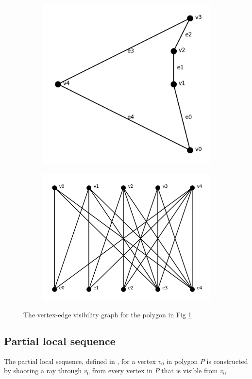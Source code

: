 \documentclass[letterpaper, 10 pt, conference]{ieeeconf}  %
\begin{document}
\begin{figure}
\centering
\begin{subfigure}{0.25\textwidth}
  \includegraphics[width=0.6\linewidth]{images/concave_pent.png}
  \label{fig:c_p}
\end{subfigure}
\begin{subfigure}{0.25\textwidth}
  \includegraphics[width=0.8\linewidth]{images/viz_edge_graph.png}
\end{subfigure}
\caption{The vertex-edge visibility graph for the polygon in Fig
\ref{fig:c_p}\label{fig:veg}}

\end{figure}


\subsection{Partial local sequence}

The partial local sequence, defined in \cite{rourke_viz}, 
for a vertex $v_0$ in polygon $P$ is constructed 
by shooting a ray through $v_0$ from every vertex in $P$ that is visible from
$v_0$.
\end{document}
